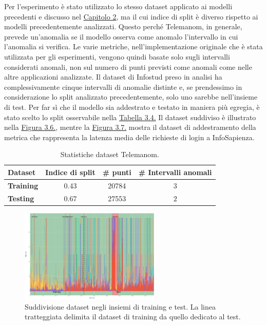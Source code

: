     Per l'esperimento è stato utilizzato lo stesso dataset applicato ai modelli precedenti e discusso nel 
    \hyperref[cap2]{Capitolo 2}, ma il cui indice di split è diverso rispetto ai modelli 
    precedentemente analizzati. Questo perché Telemanom, in generale, prevede un'anomalia se il modello osserva come anomalo 
    l'intervallo in cui l'anomalia si verifica. Le varie metriche, nell'implementazione originale che è stata 
    utilizzata per gli esperimenti, vengono quindi basate solo sugli intervalli considerati anomali, non sul numero 
    di punti previsti come anomali come nelle altre applicazioni analizzate. Il dataset di Infostud preso in 
    analisi ha complessivamente cinque intervalli di anomalie distinte e, se prendessimo 
    in considerazione lo split analizzato precedentemente, solo uno sarebbe nell'insieme di test. Per far sì che il modello 
    sia addestrato e testato in maniera più egregia, è stato scelto lo split osservabile nella 
    \hyperref[tab:dataset-telemanom]{Tabella 3.4.} Il dataset suddiviso è illustrato nella \hyperref[fig:telemanom-data]{Figura 3.6.}, 
    mentre la \hyperref[fig:telemanom-train]{Figura 3.7.} mostra il dataset di addestramento della metrica che 
    rappresenta la latenza media delle richieste di login a InfoSapienza.

    \begin{table}[H]
        \centering
        \caption{Statistiche dataset Telemanom.}
        \begin{tabular}{lccc}
            \toprule
            \textbf{Dataset} & \textbf{Indice di split} & \textbf{\# punti} & \textbf{\# Intervalli anomali} \\
            \midrule
            \textbf{Training} & 0.43 & 20784  & $3$ \\
            \textbf{Testing} & 0.67 & 27553 & $2$ \\
            \bottomrule
        \end{tabular}
        \label{tab:dataset-telemanom}
    \end{table}

    \begin{figure}[H]
        \centering
        \includegraphics[width=0.6\textwidth]{./input/chapters/models/figs/telemanom-data.png}
        \caption{Suddivisione dataset negli insiemi di training e test. La linea tratteggiata delimita il dataset 
        di training da quello dedicato al test.}
        \label{fig:telemanom-data}
    \end{figure}

